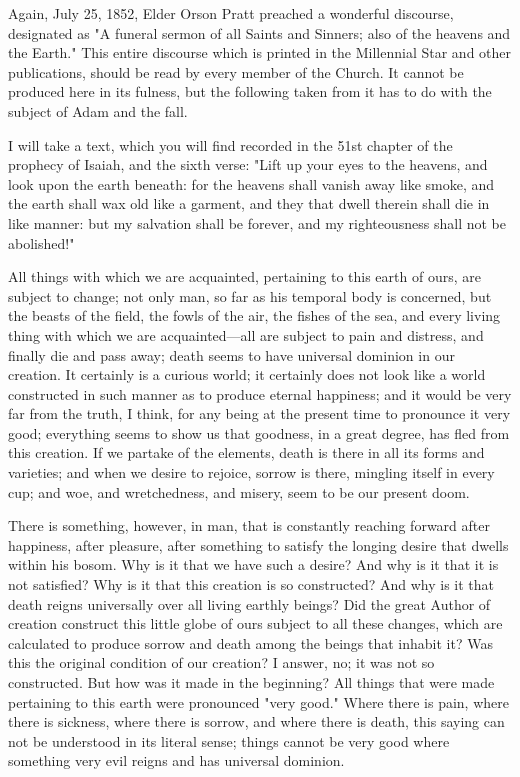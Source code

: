 Again, July 25, 1852, Elder Orson Pratt preached a wonderful discourse, designated as "A
funeral sermon of all Saints and Sinners; also of the heavens and the Earth." This entire
discourse which is printed in the Millennial Star and other publications, should be read by
every member of the Church. It cannot be produced here in its fulness, but the following
taken from it has to do with the subject of Adam and the fall.

I will take a text, which you will find recorded in the 51st chapter of the prophecy of Isaiah,
and the sixth verse: "Lift up your eyes to the heavens, and look upon the earth beneath: for
the heavens shall vanish away like smoke, and the earth shall wax old like a garment, and
they that dwell therein shall die in like manner: but my salvation shall be forever, and my
righteousness shall not be abolished!"

All things with which we are acquainted, pertaining to this earth of ours, are subject to
change; not only man, so far as his temporal body is concerned, but the beasts of the field,
the fowls of the air, the fishes of the sea, and every living thing with which we are
acquainted—all are subject to pain and distress, and finally die and pass away; death seems
to have universal dominion in our creation. It certainly is a curious world; it certainly does
not look like a world constructed in such manner as to produce eternal happiness; and it
would be very far from the truth, I think, for any being at the present time to pronounce it
very good; everything seems to show us that goodness, in a great degree, has fled from this
creation. If we partake of the elements, death is there in all its forms and varieties; and when
we desire to rejoice, sorrow is there, mingling itself in every cup; and woe, and
wretchedness, and misery, seem to be our present doom.

There is something, however, in man, that is constantly reaching forward after happiness,
after pleasure, after something to satisfy the longing desire that dwells within his bosom.
Why is it that we have such a desire? And why is it that it is not satisfied? Why is it that this
creation is so constructed? And why is it that death reigns universally over all living earthly
beings? Did the great Author of creation construct this little globe of ours subject to all these
changes, which are calculated to produce sorrow and death among the beings that inhabit it?
Was this the original condition of our creation? I answer, no; it was not so constructed. But
how was it made in the beginning? All things that were made pertaining to this earth were
pronounced "very good." Where there is pain, where there is sickness, where there is sorrow,
and where there is death, this saying can not be understood in its literal sense; things cannot
be very good where something very evil reigns and has universal dominion.


